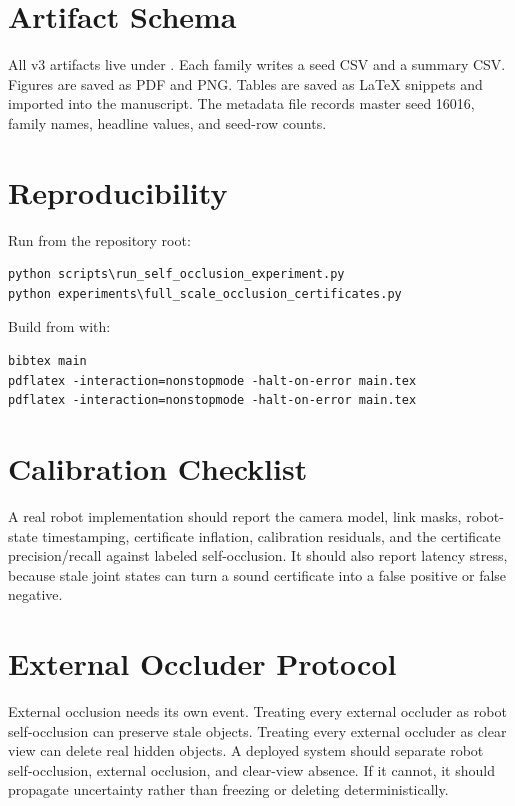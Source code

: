 \documentclass{article}
\begin{document}
\section{Artifact Schema}

All v3 artifacts live under . Each family writes a
seed CSV and a summary CSV. Figures are saved as PDF and PNG. Tables are saved
as LaTeX snippets and imported into the manuscript. The metadata file records
master seed 16016, family names, headline values, and seed-row counts.

\begin{table}[t]
\centering
\caption{Claim-to-evidence map generated by the v3 runner.}
\resizebox{\linewidth}{!}{}
\label{tab:claims}
\end{table}

\section{Reproducibility}

Run from the repository root:
\begin{verbatim}
python scripts\run_self_occlusion_experiment.py
python experiments\full_scale_occlusion_certificates.py
\end{verbatim}
Build from  with:
\begin{verbatim}
bibtex main
pdflatex -interaction=nonstopmode -halt-on-error main.tex
pdflatex -interaction=nonstopmode -halt-on-error main.tex
\end{verbatim}

\section{Calibration Checklist}

A real robot implementation should report the camera model, link masks,
robot-state timestamping, certificate inflation, calibration residuals, and the
certificate precision/recall against labeled self-occlusion. It should also
report latency stress, because stale joint states can turn a sound certificate
into a false positive or false negative.

\section{External Occluder Protocol}

External occlusion needs its own event. Treating every external occluder as
robot self-occlusion can preserve stale objects. Treating every external
occluder as clear view can delete real hidden objects. A deployed system should
separate robot self-occlusion, external occlusion, and clear-view absence. If it
cannot, it should propagate uncertainty rather than freezing or deleting
deterministically.
\end{document}
